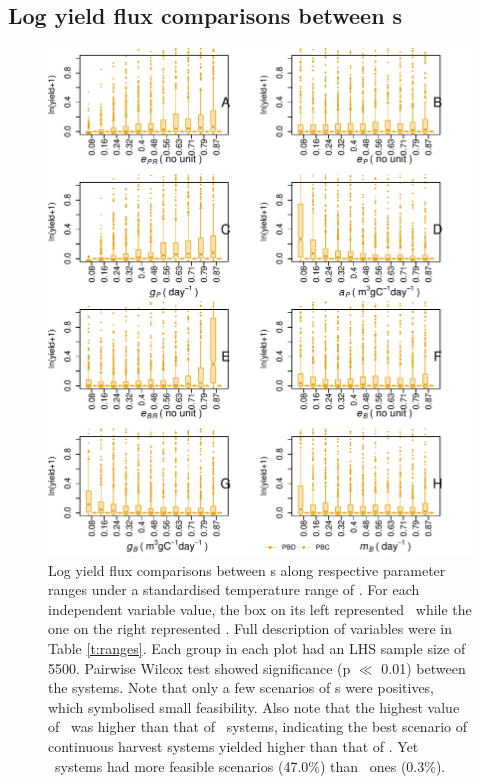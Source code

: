 \documentclass[../thesis.tex]{subfiles} %
\begin{document}
\subsection{Log yield flux comparisons between \pbs s}
\begin{figure}[H]
    \centering
    \includegraphics[width=.95\linewidth]{result/harvB.pdf}
    \caption[Log yield flux comparisons between \pbs s]{Log yield flux comparisons between \pbs s along respective parameter ranges under a standardised temperature range of \temp.  For each independent variable value, the box on its left represented \PBN\ while the one on the right represented \PBH.  Full description of variables were in Table \ref{t:ranges}.  Each group in each plot had an LHS sample size of 5500.  Pairwise Wilcox test showed significance (p $\ll$ 0.01) between the systems.  Note that only a few scenarios of \pbs s were positives, which symbolised small feasibility.  Also note that the highest value of \PBH\ was higher than that of \PBN\ systems, indicating the best scenario of continuous harvest systems yielded higher than that of \PBN.  Yet \PBN\ systems had more feasible scenarios (47.0\%) than \PBH\ ones (0.3\%).}
    \label{f:harvPB}
\end{figure}
\end{document}
